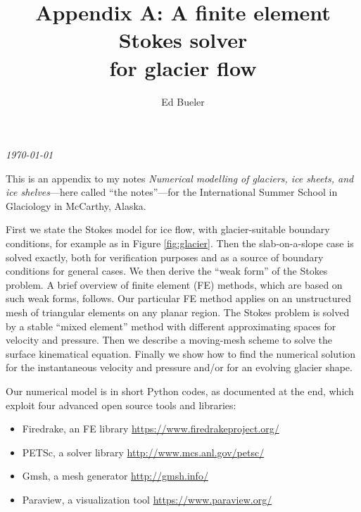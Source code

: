 \documentclass[letterpaper,final,12pt,reqno]{amsart}
\begin{document}
\graphicspath{{figures/}}

\title[Appendix A]{Appendix A: A finite element Stokes solver \\ for glacier flow}

\author{Ed Bueler}

\maketitle

\vspace{-8mm}
\begin{center}
\footnotesize
\emph{\today}
\end{center}

\thispagestyle{empty}
\bigskip

\renewcommand{\thefigure}{A\arabic{figure}}
\renewcommand{\theequation}{A\arabic{equation}}
\renewcommand{\thesection}{A.\arabic{section}}

This is an appendix to my notes \emph{Numerical modelling of glaciers, ice sheets, and ice shelves}---here called ``the notes''---for the International Summer School in Glaciology in McCarthy, Alaska.

First we state the Stokes model for ice flow, with glacier-suitable boundary conditions, for example as in Figure \ref{fig:glacier}.  Then the slab-on-a-slope case is solved exactly, both for verification purposes and as a source of boundary conditions for general cases.  We then derive the ``weak form'' of the Stokes problem.  A brief overview of finite element (FE) methods, which are based on such weak forms, follows.  Our particular FE method applies on an unstructured mesh of triangular elements on any planar region.  The Stokes problem is solved by a stable ``mixed element'' method with different approximating spaces for velocity and pressure.  Then we describe a moving-mesh scheme to solve the surface kinematical equation.  Finally we show how to find the numerical solution for the instantaneous velocity and pressure and/or for an evolving glacier shape.

Our numerical model is in short Python codes, as documented at the end, which exploit four advanced open source tools and libraries:
\begin{itemize}
\item Firedrake, an FE library \hfill \url{https://www.firedrakeproject.org/}
\item PETSc, a solver library \hfill \url{http://www.mcs.anl.gov/petsc/}
\item Gmsh, a mesh generator \hfill \url{http://gmsh.info/}
\item Paraview, a visualization tool \hfill \url{https://www.paraview.org/}
\end{itemize}
\end{document}
